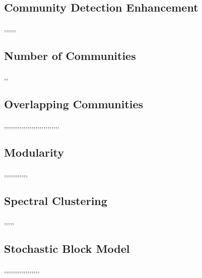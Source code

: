 \subsection{Community Detection Enhancement}
\cite{yun2014community},\cite{burgess2016link},\cite{darst2014improving},\cite{chen2014improved},\cite{li2010genetic},\cite{mcdaid2013improved},\cite{lee2013improved}


\subsection{Number of Communities}
\cite{balcan2013finding},\cite{zhang2016community},

\subsection{Overlapping Communities}
\cite{xie2011slpa},\cite{mcdaid2010detecting},\cite{esquivel2011compression},\cite{ball2011efficient},\cite{xie2012towards},\cite{gregory2011fuzzy},\cite{havemann2011identification},\cite{nicosia2009extending},\cite{lee2010detecting},\cite{psorakis2011overlapping},\cite{nguyen2011overlapping},\cite{yang2014overlapping},\cite{chen2014local},\cite{mossel2012stochastic},\cite{shi2013link},\cite{wang2013discovering},\cite{rees2010overlapping},\cite{wang2013fuzzy},\cite{cazabet2010detection},\cite{jin2011markov},\cite{peixoto2015model},\cite{li2017motif},\cite{cui2013online},\cite{lim2014linkscan},\cite{sun2011identification},\cite{huang2013fast},\cite{cui2014uncovering},\cite{gregory2010finding},


\subsection{Modularity}
\cite{newman2006finding},\cite{arenas2007size},\cite{good2010performance},\cite{santiago2017efficient},\cite{he2016joint},\cite{zhang2014scalable},\cite{aloise2012modularity},\cite{cafieri2010loops},\cite{rotta2011multilevel},\cite{havens2013soft},\cite{lambiotte2010multi},\cite{de2011generalized},

\subsection{Spectral Clustering}
\cite{balakrishnan2011noise},\cite{bickel2016hypothesis},\cite{coja2010graph},\cite{mahmood2015subspace},\cite{mirkin2012additive},


\subsection{Stochastic Block Model}
\cite{gao2017achieving},\cite{cai2015robust},\cite{newman2013community},\cite{rohe2011spectral},\cite{lei2015consistency},\cite{bickel2013asymptotic},\cite{fishkind2013consistent},\cite{sussman2012consistent},\cite{choi2012stochastic},\cite{decelle2011asymptotic},\cite{abbe2015exact},,\cite{abbe2015recovering},\cite{mossel2015reconstruction},\cite{come2015model},\cite{latouche2012variational},\cite{rohe2012co},\cite{zhu2014oriented},

